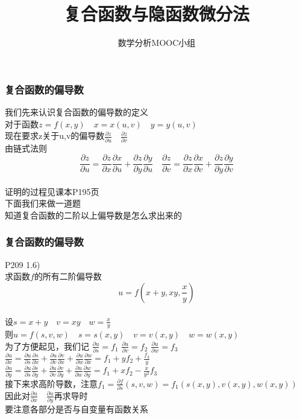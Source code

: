\documentclass[xetex]{beamer}
\title{复合函数与隐函数微分法}
\author{数学分析MOOC小组}
\date{}
\begin{document}
\frame{\maketitle}

\begin{frame}
    \frametitle{复合函数的偏导数}

    我们先来认识复合函数的偏导数的定义\\
    对于函数$ z=f(x,y)\quad x=x(u,v)\quad y=y(u,v) $\\\pause
    现在要求z关于u,v的偏导数$\frac{\partial z}{\partial u}\quad \frac{\partial z}{\partial v}$\\\pause
    由链式法则$$ \frac{\partial z}{\partial u}=\frac{\partial z}{\partial x}\frac{\partial x}{\partial u}+
    \frac{\partial z}{\partial y}\frac{\partial y}{\partial u}
    \quad \frac{\partial z}{\partial v}=\frac{\partial z}{\partial x}\frac{\partial x}{\partial v}+
    \frac{\partial z}{\partial y}\frac{\partial y}{\partial v} $$\\\pause
    证明的过程见课本P195页\\
    下面我们来做一道题\\
    知道复合函数的二阶以上偏导数是怎么求出来的\\\pause

\end{frame}

\begin{frame}
\frametitle{复合函数的偏导数}
	P209 1.6)\\
	求函数$f$的所有二阶偏导数\\
	$$u=f(x+y,xy,\frac{x}{y})$$\\
	设$s=x+y\quad v=xy\quad w=\frac{x}{y}$\\
	则$u=f(s,v,w)\quad s=s(x,y)\quad v=v(x,y)\quad w=w(x,y)$\\
	为了方便起见，我们记
	$\frac{\partial u}{\partial s}=f_1$\quad 
	$\frac{\partial u}{\partial v}=f_2$
	\quad $\frac{\partial u}{\partial w}=f_3$\\ \pause
	$\frac{\partial u}{\partial x}=
	\frac{\partial u}{\partial s}\frac{\partial s}{\partial x}+
	\frac{\partial u}{\partial v}\frac{\partial v}{\partial x}+
	\frac{\partial u}{\partial w}\frac{\partial w}{\partial x}=f_1+yf_2+\frac{f_3}{y}$\\ \pause
	$\frac{\partial u}{\partial y}=
	\frac{\partial u}{\partial s}\frac{\partial s}{\partial y}+
	\frac{\partial u}{\partial v}\frac{\partial v}{\partial y}+
	\frac{\partial u}{\partial w}\frac{\partial w}{\partial y}=f_1+xf_2-\frac{x}{y^2}f_3$\\ \pause
	接下来求高阶导数，注意$f_1=\frac{\partial f}{\partial s}(s,v,w)=f_1(s(x,y),v(x,y),w(x,y))$\\ \pause
	因此对$\frac{\partial u}{\partial x}\quad \frac{\partial u}{\partial y}$再求导时\\
	要注意各部分是否与自变量有函数关系\\
	

\end{frame}
\end{document}
